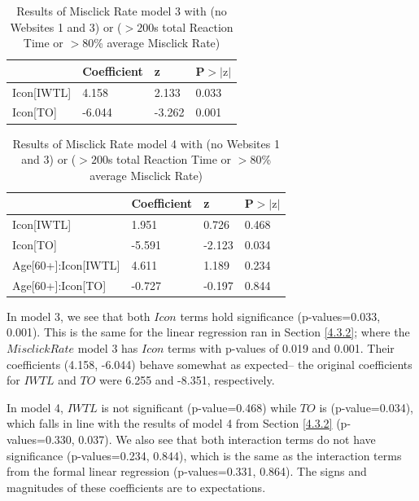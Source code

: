 \documentclass[12pt,twoside]{reedthesis}
\begin{document}
    \begin{table}[H]
        \centering
        \begin{tabular}{| p{3.5cm} | p{2.5cm} | p{2.5cm} | p{2.5cm} |}
            \hline
            & Coefficient & z & P$>|\text{z}|$\\
            \hline
            Icon[IWTL] & 4.158 &  2.133 & 0.033\\
            \hline
            Icon[TO] & -6.044 & -3.262 & 0.001\\
            \hline
        \end{tabular}
        \caption{Results of Misclick Rate model 3 with (no Websites 1 and 3) or ($>200$s total Reaction Time or $>80$\% average Misclick Rate)}
        \label{n13_m3_mr}
    \end{table}

    \begin{table}[H]
        \centering
        \begin{tabular}{| p{5cm} | p{2.5cm} | p{2.5cm} | p{2.5cm} |}
            \hline
            & Coefficient & z & P$>|\text{z}|$\\
            \hline
            Icon[IWTL] & 1.951 & 0.726 & 0.468\\
            \hline
            Icon[TO] & -5.591 & -2.123 &  0.034\\
            \hline
            Age[60+]:Icon[IWTL] & 4.611 & 1.189 & 0.234\\
            \hline
            Age[60+]:Icon[TO] & -0.727 & -0.197 & 0.844\\
            \hline
        \end{tabular}
        \caption{Results of Misclick Rate model 4 with (no Websites 1 and 3) or ($>200$s total Reaction Time or $>80$\% average Misclick Rate)}
        \label{n13_m4_mr}
    \end{table}

    In model 3, we see that both $Icon$ terms hold significance (p-values=0.033, 0.001). This is the same for the linear regression ran in Section \ref{4.3.2}; where the $Misclick Rate$ model 3 has $Icon$ terms with p-values of 0.019 and 0.001. Their coefficients (4.158, -6.044) behave somewhat as expected-- the original coefficients for $IWTL$ and $TO$ were 6.255 and -8.351, respectively.

    In model 4, $IWTL$ is not significant (p-value=0.468) while $TO$ is (p-value=0.034), which falls in line with the results of model 4 from Section \ref{4.3.2} (p-values=0.330, 0.037). We also see that both interaction terms do not have significance (p-values=0.234, 0.844), which is the same as the interaction terms from the formal linear regression (p-values=0.331, 0.864). The signs and magnitudes of these coefficients are to expectations. 
\end{document}
